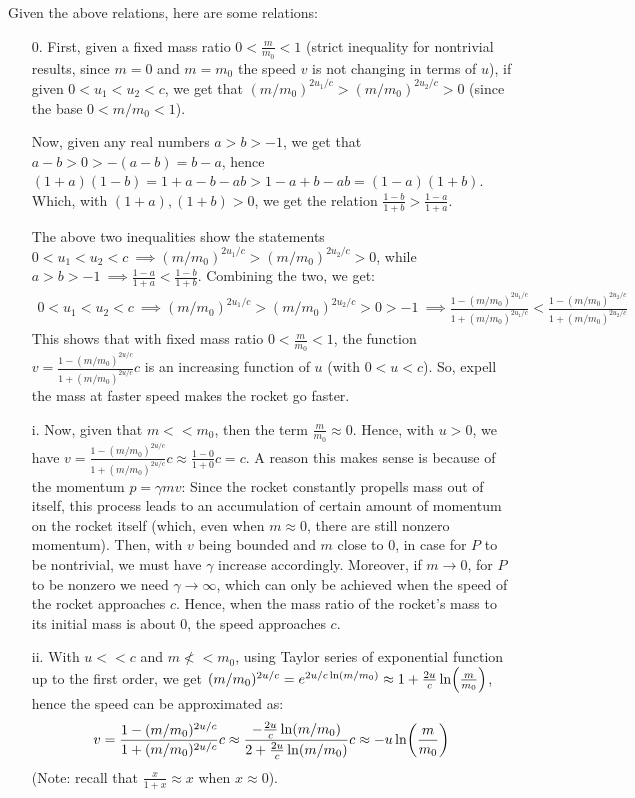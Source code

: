 \documentclass{article}
\DeclarePairedDelimiter{\paran}{(}{)}%
\begin{document}
\hfil

Given the above relations, here are some relations:
\begin{itemize}
    \item[0.] First, given a fixed mass ratio $0<\frac{m}{m_0}< 1$ (strict inequality for nontrivial results, since $m=0$ and $m=m_0$ the speed $v$ is not changing in terms of $u$), if given $0<u_1<u_2<c$, we get that $(m/m_0)^{2u_1/c} > (m/m_0)^{2u_2/c}>0$ (since the base $0<m/m_0<1$). 
    
    Now, given any real numbers $a>b>-1$, we get that $a-b>0>-(a-b) = b-a$, hence $(1+a)(1-b) = 1+a-b-ab > 1-a+b-ab = (1-a)(1+b)$. Which, with $(1+a),(1+b)>0$, we get the relation $\frac{1-b}{1+b}>\frac{1-a}{1+a}$.

    The above two inequalities show the statements $0<u_1<u_2<c\ \implies (m/m_0)^{2u_1/c} > (m/m_0)^{2u_2/c}>0$, while $a>b>-1\ \implies \frac{1-a}{1+a}<\frac{1-b}{1+b}$. Combining the two, we get:
    \begin{align}
        0<u_1<u_2<c\ \implies (m/m_0)^{2u_1/c} > (m/m_0)^{2u_2/c}>0>-1\ \implies \frac{1-(m/m_0)^{2u_1/c}}{1+(m/m_0)^{2u_1/c}} < \frac{1-(m/m_0)^{2u_2/c}}{1+(m/m_0)^{2u_2/c}}
    \end{align}
    This shows that with fixed mass ratio $0<\frac{m}{m_0}<1$, the function $v=\frac{1-(m/m_0)^{2u/c}}{1+(m/m_0)^{2u/c}}c$ is an increasing function of $u$ (with $0<u<c$). So, expell the mass at faster speed makes the rocket go faster.

    \hfil

    \item[i.] Now, given that $m<<m_0$, then the term $\frac{m}{m_0}\approx 0$. Hence, with $u>0$, we have $v=\frac{1-(m/m_0)^{2u/c}}{1+(m/m_0)^{2u/c}}c \approx \frac{1-0}{1+0}c = c$. A reason this makes sense is because of the momentum $p=\gamma mv$: Since the rocket constantly propells mass out of itself, this process leads to an accumulation of certain amount of momentum on the rocket itself (which, even when $m\approx 0$, there are still nonzero momentum). Then, with $v$ being bounded and $m$ close to $0$, in case for $P$ to be nontrivial, we must have $\gamma$ increase accordingly. Moreover, if $m\rightarrow 0$, for $P$ to be nonzero we need $\gamma\rightarrow \infty$, which can only be achieved when the speed of the rocket approaches $c$. Hence, when the mass ratio of the rocket's mass to its initial mass is about $0$, the speed approaches $c$.
    
    \item[ii.] With $u<<c$ and $m\not<< m_0$, using Taylor series of exponential function up to the first order, we get $(m/m_0)^{2u/c} = e^{2u/c\ln(m/m_0)} \approx 1+\frac{2u}{c}\ln\paran*{\frac{m}{m_0}}$, hence the speed can be approximated as:
    \begin{align}
        v=\frac{1-(m/m_0)^{2u/c}}{1+(m/m_0)^{2u/c}}c \approx \frac{-\frac{2u}{c}\ln(m/m_0)}{2+\frac{2u}{c}\ln(m/m_0)}c \approx -u\ln\paran*{\frac{m}{m_0}}
    \end{align}
    (Note: recall that $\frac{x}{1+x}\approx x$ when $x\approx 0$).


\end{itemize}
\end{document}
